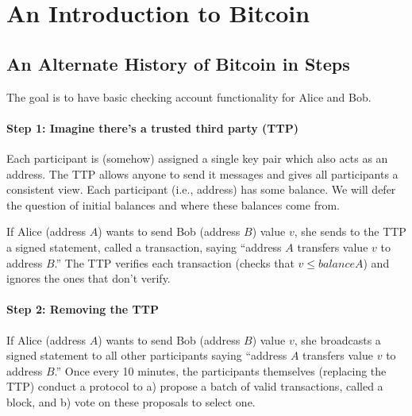\section{An Introduction to Bitcoin}


\subsection{An Alternate History of Bitcoin in Steps}

The goal is to have basic checking account functionality for Alice and Bob.

\paragraph{Step 1: Imagine there’s a trusted third party (TTP)}
 Each participant is (somehow) assigned a single key pair which also acts as an address. The TTP allows anyone to send it messages and gives all participants a consistent view. Each participant (i.e., address) has some balance. We will defer the question of initial balances and where these balances come from.

If Alice (address $A$) wants to send Bob (address $B$) value $v$, she sends to the TTP a signed statement, called a transaction, saying “address $A$ transfers value $v$ to address $B$.” The TTP verifies each transaction (checks that $v ≤ balanceA$) and ignores the ones that don’t verify.

\paragraph{Step 2: Removing the TTP}

If Alice (address $A$) wants to send Bob (address $B$) value $v$, she broadcasts a signed statement to all other participants saying “address $A$ transfers value $v$ to address $B$.” Once every 10 minutes, the participants themselves (replacing the TTP) conduct a protocol to a) propose a batch of valid transactions, called a block, and b) vote on these proposals to select one.

